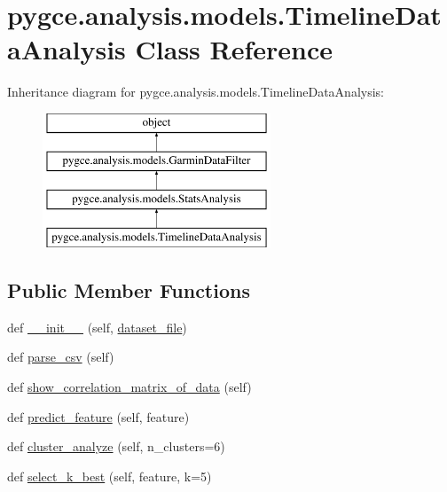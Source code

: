 \hypertarget{classpygce_1_1analysis_1_1models_1_1_timeline_data_analysis}{}\section{pygce.\+analysis.\+models.\+Timeline\+Data\+Analysis Class Reference}
\label{classpygce_1_1analysis_1_1models_1_1_timeline_data_analysis}
Inheritance diagram for pygce.\+analysis.\+models.\+Timeline\+Data\+Analysis\+:\begin{figure}[H]
\begin{center}
\leavevmode
\includegraphics[height=4.000000cm]{classpygce_1_1analysis_1_1models_1_1_timeline_data_analysis}
\end{center}
\end{figure}
\subsection*{Public Member Functions}
\begin{DoxyCompactItemize}
\item 
def \hyperlink{classpygce_1_1analysis_1_1models_1_1_timeline_data_analysis_a7fccb7531cafe3b618ad7026db2d3b53}{\+\_\+\+\_\+init\+\_\+\+\_\+} (self, \hyperlink{classpygce_1_1analysis_1_1models_1_1_garmin_data_filter_a7bb7be05577c2d31546e27823a5d11c5}{dataset\+\_\+file})
\item 
def \hyperlink{classpygce_1_1analysis_1_1models_1_1_timeline_data_analysis_a1a02ca1184152091fc1f66306e1ac02c}{parse\+\_\+csv} (self)
\item 
def \hyperlink{classpygce_1_1analysis_1_1models_1_1_timeline_data_analysis_ac5f4540c89ea52ccbd5c28ce850bc1d3}{show\+\_\+correlation\+\_\+matrix\+\_\+of\+\_\+data} (self)
\item 
def \hyperlink{classpygce_1_1analysis_1_1models_1_1_timeline_data_analysis_ab769c6f075333081a68712e0ecf8b094}{predict\+\_\+feature} (self, feature)
\item 
def \hyperlink{classpygce_1_1analysis_1_1models_1_1_timeline_data_analysis_a4bdbc9b67a365b2e0d5a76e7bd811ce5}{cluster\+\_\+analyze} (self, n\+\_\+clusters=6)
\item 
def \hyperlink{classpygce_1_1analysis_1_1models_1_1_timeline_data_analysis_a2f8938bff9d88b45dbdc7342b84d1bc6}{select\+\_\+k\+\_\+best} (self, feature, k=5)
\end{DoxyCompactItemize}
